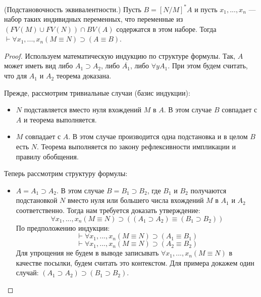 \begin{theorem}
    (Подстановочность эквивалентности.) Пусть $B=[N/M]^*A$ и пусть $x_1,...,x_n$ --- набор таких индивидных переменных, что переменные из $\left(FV(M) \cup FV(N)\right) \cap BV(A)$ содержатся в этом наборе. Тогда $\vdash \forall x_1,...,x_n (M \equiv N) \supset (A \equiv B)$.
\end{theorem}
\begin{proof}
    Используем математическую индукцию по структуре формулы. Так, $A$ может иметь вид либо $A_1\supset A_2$, либо $\overline{A_1}$, либо $\forall y A_1$. При этом будем считать, что для $A_1$ и $A_2$ теорема доказана.

    Прежде, рассмотрим тривиальные случаи (базис индукции):
    \begin{itemize}
        \item $N$ подставляется вместо нуля вхождений $M$ в $A$. В этом случае $B$ совпадает с $A$ и теорема выполняется.
        \item $M$ совпадает с $A$. В этом случае производится одна подстановка и в целом $B$ есть $N$. Теорема выполняется по закону рефлексивности импликации и правилу обобщения.
    \end{itemize}
    
    Теперь рассмотрим структуру формулы:
    \begin{itemize}
        \item $A=A_1\supset A_2$. В этом случае $B=B_1\supset B_2$, где $B_1$ и $B_2$ получаются подстановкой $N$ вместо нуля или большего числа вхождений $M$ в $A_1$ и $A_2$ соответственно. Тогда нам требуется доказать утверждение:
        \begin{equation*}
            \forall x_1,...,x_n (M\equiv N) \supset ((A_1 \supset A_2) \equiv (B_1 \supset B_2))
        \end{equation*} 
        По предположению индукции:
        \begin{equation*}
            \vdash \forall x_1,...,x_n (M\equiv N) \supset (A_1 \equiv B_1)
        \end{equation*}
        \begin{equation*}
            \vdash \forall x_1,...,x_n (M\equiv N) \supset (A_2 \equiv B_2)
        \end{equation*}
        Для упрощения не будем в выводе записывать $\forall x_1,...,x_n (M\equiv N)$ в качестве посылки, будем считать это контекстом. Для примера докажем один случай: $(A_1 \supset A_2) \supset (B_1 \supset B_2)$.
        

\end{itemize}
\end{proof}
